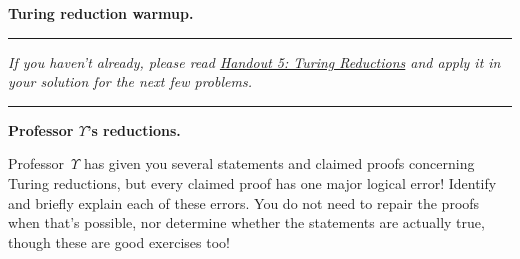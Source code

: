 \documentclass[11pt,addpoints,answers]{exam}
\newcommand{\lT}{\leq_T} %
\begin{document}
\begin{questions}
  \question \textbf{Turing reduction warmup.} \label{prob:decidablity} \nopagebreak
  

\medskip \hrule \medskip
    \emph{If you haven't already, please read \href{https://drive.google.com/file/d/1hryh8KKZmLlzNPIej31PHR1QkcNAKx9D/view}{Handout 5: Turing Reductions} and apply it in your solution for the next few problems.}
\medskip \hrule \medskip
  

  \question \textbf{Professor $\Upsilon$'s reductions.} \nopagebreak

  Professor~$\Upsilon$ has given you several statements and claimed proofs concerning Turing reductions, but every claimed proof has one major logical error!
  Identify and briefly explain each of these errors. You do not need to repair the proofs when that's possible, nor determine whether the statements are actually true, though these are good exercises too!
        

\end{questions}
\end{document}
